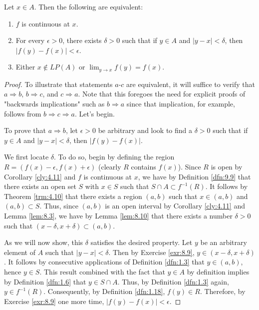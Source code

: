 \documentclass[../main.tex]{subfiles}
\begin{document}
\begin{theorem}\label{trm:11.5}
    Let $x\in A$. Then the following are equivalent:
    \begin{enumerate}[label={\textup{(}\alph*\textup{)}}]
        \item $f$ is continuous at $x$.
        \item For every $\epsilon>0$, there exists $\delta>0$ such that if $y\in A$ and $|y-x|<\delta$, then $|f(y)-f(x)|<\epsilon$.
        \item Either $x\notin LP(A)$ or $\lim_{y\to x}f(y)=f(x)$.
    \end{enumerate}
    \begin{proof}
        To illustrate that statements $a$-$c$ are equivalent, it will suffice to verify that $a\Rightarrow b$, $b\Rightarrow c$, and $c\Rightarrow a$. Note that this foregoes the need for explicit proofs of "backwards implications" such as $b\Rightarrow a$ since that implication, for example, follows from $b\Rightarrow c\Rightarrow a$. Let's begin.\par\smallskip
        To prove that $a\Rightarrow b$, let $\epsilon>0$ be arbitrary and look to find a $\delta>0$ such that if $y\in A$ and $|y-x|<\delta$, then $|f(y)-f(x)|$.\par
        We first locate $\delta$. To do so, begin by defining the region $R=(f(x)-\epsilon,f(x)+\epsilon)$ (clearly $R$ contains $f(x)$). Since $R$ is open by Corollary \ref{cly:4.11} and $f$ is continuous at $x$, we have by Definition \ref{dfn:9.9} that there exists an open set $S$ with $x\in S$ such that $S\cap A\subset f^{-1}(R)$. It follows by Theorem \ref{trm:4.10} that there exists a region $(a,b)$ such that $x\in(a,b)$ and $(a,b)\subset S$. Thus, since $(a,b)$ is an open interval by Corollary \ref{cly:4.11} and Lemma \ref{lem:8.3}, we have by Lemma \ref{lem:8.10} that there exists a number $\delta>0$ such that $(x-\delta,x+\delta)\subset(a,b)$.\par
        As we will now show, this $\delta$ satisfies the desired property. Let $y$ be an arbitrary element of $A$ such that $|y-x|<\delta$. Then by Exercise \ref{exr:8.9}, $y\in(x-\delta,x+\delta)$. It follows by consecutive applications of Definition \ref{dfn:1.3} that $y\in (a,b)$, hence $y\in S$. This result combined with the fact that $y\in A$ by definition implies by Definition \ref{dfn:1.6} that $y\in S\cap A$. Thus, by Definition \ref{dfn:1.3} again, $y\in f^{-1}(R)$. Consequently, by Definition \ref{dfn:1.18}, $f(y)\in R$. Therefore, by Exercise \ref{exr:8.9} one more time, $|f(y)-f(x)|<\epsilon$.\par\smallskip

\end{proof}
\end{theorem}
\end{document}
